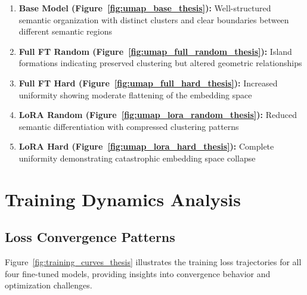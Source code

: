 \begin{enumerate}
\item \textbf{Base Model (Figure~\ref{fig:umap_base_thesis}):} Well-structured semantic organization with distinct clusters and clear boundaries between different semantic regions
\item \textbf{Full FT Random (Figure~\ref{fig:umap_full_random_thesis}):} Island formations indicating preserved clustering but altered geometric relationships
\item \textbf{Full FT Hard (Figure~\ref{fig:umap_full_hard_thesis}):} Increased uniformity showing moderate flattening of the embedding space
\item \textbf{LoRA Random (Figure~\ref{fig:umap_lora_random_thesis}):} Reduced semantic differentiation with compressed clustering patterns
\item \textbf{LoRA Hard (Figure~\ref{fig:umap_lora_hard_thesis}):} Complete uniformity demonstrating catastrophic embedding space collapse
\end{enumerate}

\section{Training Dynamics Analysis}

\subsection{Loss Convergence Patterns}

Figure~\ref{fig:training_curves_thesis} illustrates the training loss trajectories for all four fine-tuned models, providing insights into convergence behavior and optimization challenges.

